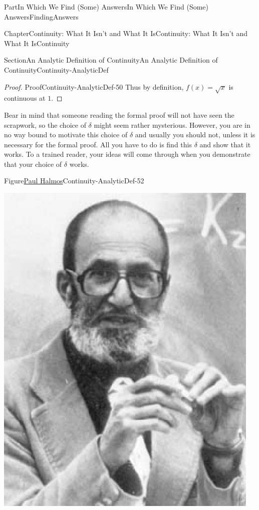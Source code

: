 \documentclass[oneside,10pt,]{book}
\numberwithin{equation}{part}
\begin{document}
\begin{partptx}{Part}{In Which We Find (Some) Answers}{}{In Which We Find (Some) Answers}{}{}{FindingAnswers}
\begin{chapterptx}{Chapter}{Continuity: What It Isn't and What It Is}{}{Continuity: What It Isn't and What It Is}{}{}{Continuity}
\begin{sectionptx}{Section}{An Analytic Definition of Continuity}{}{An Analytic Definition of Continuity}{}{}{Continuity-AnalyticDef}
\begin{proof}{Proof}{}{Continuity-AnalyticDef-50}
Thus by definition, \(f(x)=\sqrt{x}\) is continuous at \(1\).%
\end{proof}
Bear in mind that someone reading the formal proof will not have seen the scrapwork, so the choice of \(\delta\) might seem rather mysterious.  However, you are in no way bound to motivate this choice of \(\delta\) and usually you should not, unless it is necessary for the formal proof.  All you have to do is find this \(\delta\) and show that it works.   To a trained reader, your ideas will come through when you demonstrate that your choice of \(\delta\) works.%
\begin{figureptx}{Figure}{\href{https://mathshistory.st-andrews.ac.uk/Biographies/Halmos/}{Paul Halmos}\protect\footnotemark{}}{Continuity-AnalyticDef-52}{}%
%
\begin{image}{0.325}{0.35}{0.325}{}%
\includegraphics[width=\linewidth]{external/images/Halmos.png}
\end{image}%
\tcblower
\end{figureptx}%

\end{sectionptx}
\end{chapterptx}
\end{partptx}
\end{document}
